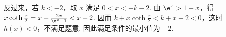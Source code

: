 \begin{solution}
\begin{enumerate}
反过来，若 \(k<-2\)，取 \(x\) 满足 \(0<x<-k-2\). 由 \(\e^x>1+x\)，得 \(x\coth \frac{x}{2}=x+\frac{2x}{\e^x-1}<x+2\). 因而 \(k+x\coth \frac{x}{2}<k+x+2<0\)，这时 \(h(x)<0\)，不满足题意.
因此满足条件的最小值为 \(-2\).
\end{enumerate}
\end{solution}
